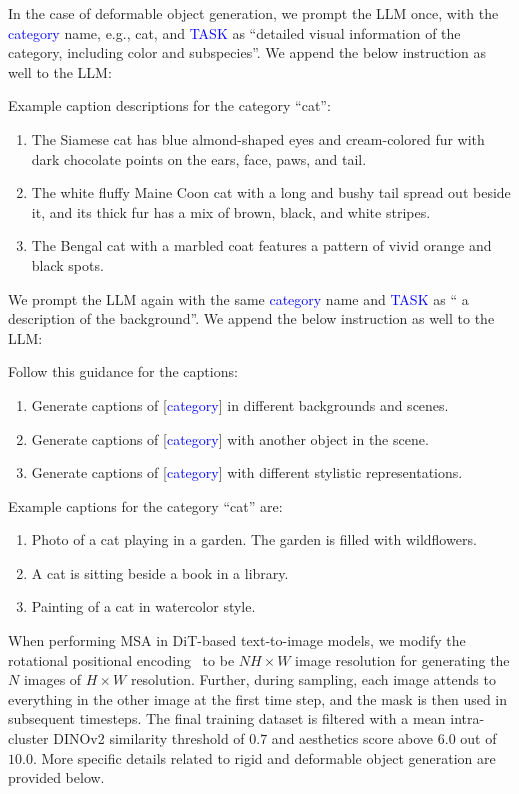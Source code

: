 In the case of deformable object generation, we prompt the LLM once, with the \textcolor{blue}{category} name, e.g., cat, and \textcolor{blue}{TASK} as ``detailed visual information of the category, including color and subspecies''. We append the below instruction as well to the LLM: 

\begin{tcolorbox}
Example caption descriptions for the category ``cat'':
\begin{enumerate}
    \item  The Siamese cat has blue almond-shaped eyes and cream-colored fur with dark chocolate points on the ears, face, paws, and tail. 
    \item The white fluffy Maine Coon cat with a long and bushy tail spread out beside it, and its thick fur has a mix of brown, black, and white stripes. 
    \item The Bengal cat with a marbled coat features a pattern of vivid orange and black spots.
\end{enumerate}
\end{tcolorbox}

We prompt the LLM again with the same \textcolor{blue}{category} name and \textcolor{blue}{TASK} as `` a description of the background''. We append the below instruction as well to the LLM: 
 \begin{tcolorbox}
Follow this guidance for the captions: 
\begin{enumerate}
    \item Generate captions of [\textcolor{blue}{category}] in different backgrounds and scenes. 
    \item Generate captions of [\textcolor{blue}{category}] with another object in the scene. 
    \item Generate captions of [\textcolor{blue}{category}] with different stylistic representations. 
\end{enumerate}

Example captions for the category ``cat'' are:
\begin{enumerate}
    \item Photo of a cat playing in a garden. The garden is filled with wildflowers. 
    \item A cat is sitting beside a book in a library. 
    \item Painting of a cat in watercolor style.
\end{enumerate}
\end{tcolorbox}


\newpage
{} When performing MSA in DiT-based text-to-image models, we modify the rotational positional encoding~\cite{su2024roformer} to be $N H \times W$ image resolution for generating the $N$ images of $H \times W$ resolution. Further, during sampling, each image attends to everything in the other image at the first time step, and the mask is then used in subsequent timesteps. The final training dataset is filtered with a mean intra-cluster DINOv2 similarity threshold of $0.7$ and aesthetics score above $6.0$ out of $10.0$. More specific details related to rigid and deformable object generation are provided below. 

